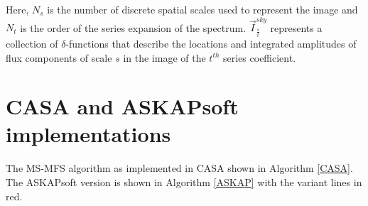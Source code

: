 \documentclass[11pt,a4paper]{article}
\begin{document}
Here, $N_s$ is the number of discrete spatial scales used to represent the image and  
$N_t$ is the order of the series expansion of the spectrum. $\vec{I}^{sky}_\frac{s}{t}$ represents 
a collection of $\delta$-functions that describe the locations
and integrated amplitudes of flux components of scale $s$ in the image of the $t^{th}$ series 
coefficient. 

\clearpage
\section{CASA and ASKAPsoft implementations}

The MS-MFS algorithm as implemented in CASA shown in Algorithm \ref{CASA}. The ASKAPsoft version is shown in Algorithm \ref{ASKAP} with the variant lines in red.


\clearpage
\end{document}
